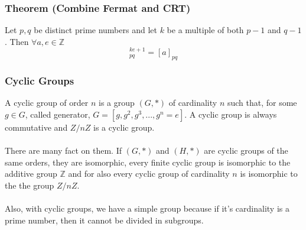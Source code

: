 \documentclass{article}
\begin{document}
\subsubsection{Theorem (Combine Fermat and CRT)} Let $ p, q $ be distinct prime numbers and let $ k $ be a multiple of both $ p-1 $ and $ q-1 $. Then $ \forall a, e \in \mathbb{Z} $
\begin{equation}
[a]^{ke + 1}_{pq} = [a]_{pq}
\end{equation}

\subsubsection{Cyclic Groups} A cyclic group of order $ n $ is a group $ (G, *) $ of cardinality $ n $ such that, for some $ g \in G $, called generator, $ G = [g, g^2, g^3, ..., g^n = e] $. A cyclic group is always commutative and $ Z/nZ $ is a cyclic group.
\\
\\
There are many fact on them. If $ (G, *) $ and $ (H, *) $ are cyclic groups of the same orders, they are isomorphic, every finite cyclic group is isomorphic to the additive group $ \mathbb{Z} $ and for also every cyclic group of cardinality $ n $ is isomorphic to the the group $ Z/nZ $.
\\
\\
Also, with cyclic groups, we have a simple group because if it's cardinality is a prime number, then it cannot be divided in subgroups.

\begin{figure}%
    \centering
    \qquad
    \caption{}%
    \label{fig:cyclicgroup2}%
\end{figure}
\end{document}

